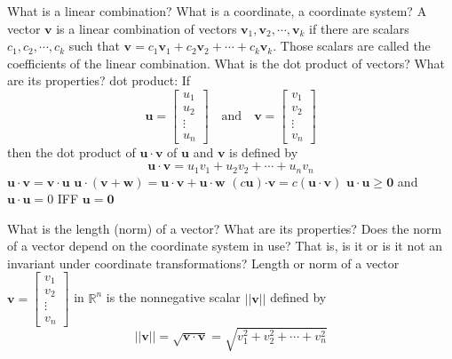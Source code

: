 \documentclass{article}
\begin{document}
\begin{outline}[enumerate]
        \1 What is a linear combination? What is a coordinate, a coordinate system?
            \2 A vector $\mathbf v$ is a linear combination of vectors \(\mathbf v_1,\mathbf v_2,\cdots,\mathbf v_k\) if there are scalars \(c_1,c_2,\cdots,c_k\) such that \(\mathbf v=c_1\mathbf v_1+c_2\mathbf v_2+\cdots+c_k\mathbf v_k\). Those scalars are called the coefficients of the linear combination. 
        \1 What is the dot product of vectors? What are its properties?
            \2 dot product: If \[\mathbf u=\begin{bmatrix}u_1\\u_2\\\vdots\\u_n\end{bmatrix}\quad\text{and}\quad\mathbf v=\begin{bmatrix}v_1\\v_2\\\vdots\\v_n\end{bmatrix}\] then the dot product of \(\mathbf u\cdot\mathbf v\) of \(\mathbf u\) and \(\mathbf v\) is defined by \[\mathbf u\cdot\mathbf v=u_1v_1+u_2v_2+\cdots+u_nv_n\]
            \2 \(\mathbf{u\cdot v}=\mathbf{v\cdot u}\)
            \2 \(\mathbf{u\cdot}(\mathbf{v+w})=\mathbf{u\cdot v+u\cdot w}\)
            \2 \((c\mathbf u)\mathbf{\cdot v}=c(\mathbf{u\cdot v})\)
            \2 \(\mathbf{u\cdot u\geq 0}\) and \(\mathbf{u\cdot u}=0\) IFF \(\mathbf u=\mathbf 0\)

        \1 What is the length (norm) of a vector? What are its properties? Does the norm of a vector depend on the coordinate system in use? That is, is it or is it not an invariant under coordinate transformations?
            \2 Length or norm of a vector \(\mathbf v=\begin{bmatrix}v_1\\v_2\\\vdots\\v_n\end{bmatrix}\) in \(\mathbb R^n\) is the nonnegative scalar \(||\mathbf v||\) defined by \[||\mathbf v||=\sqrt{\mathbf{v\cdot v}}=\sqrt{v_1^2+v_2^2+\cdots+v_n^2}\]


\end{outline}
\end{document}

